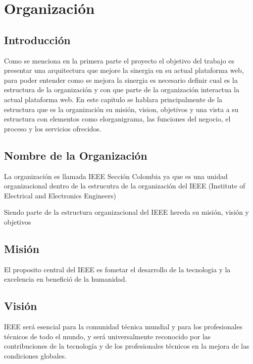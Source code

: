 \chapter{Organización}
\section{Introducción}
Como se menciona en la primera parte el proyecto el objetivo del trabajo es presentar una arquitectura que mejore la sinergia en su actual plataforma web, para poder entender como se mejora la sinergia es necesario definir cual es la estructura de la organización y con que parte de la organización interactua la actual plataforma web. En este capitulo se hablara principalmente de la estructura que es la organización su misión, vision, objetivos y una vista a su estructura con elementos como elorganigrama, las funciones del negocio, el proceso y los servicios ofrecidos.
\newpage
\section{Nombre de la Organización}
La organización es llamada IEEE Sección Colombia ya que es una unidad organizacional dentro de la estrucutra de la organización del IEEE (Institute of Electrical and Electronics Engineers)

Siendo parte de la estructura organizacional del IEEE hereda su misión, visión y objetivos
\section{Misión}
 El proposito central del IEEE es fometar el desarrollo de la tecnologia y la excelencia en benefició de la humanidad.\cite{IEEEMisionVision}
\section{Visión}
IEEE será esencial para la comunidad técnica mundial y para los profesionales técnicos de todo el mundo, y será universalmente reconocido por las contribuciones de la tecnología y de los profesionales técnicos en la mejora de las condiciones globales.
